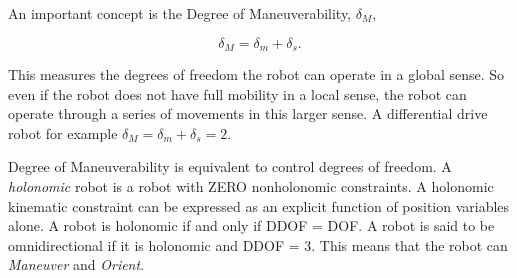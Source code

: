 An important concept is the Degree of Maneuverability, \(\delta_M\),

\[\delta_M = \delta_m + \delta_s.\]

This measures the degrees of freedom the robot can operate in a global
sense. So even if the robot does not have full mobility in a local
sense, the robot can operate through a series of movements in this
larger sense. A differential drive robot for example
\(\delta_M = \delta_m + \delta_s = 2\).

Degree of Maneuverability is equivalent to control degrees of freedom. A
\emph{holonomic} robot is a robot with ZERO nonholonomic constraints. A
holonomic kinematic constraint can be expressed as an explicit function
of position variables alone. A robot is holonomic if and only if DDOF =
DOF. A robot is said to be omnidirectional if it is holonomic and DDOF =
3. This means that the robot can \emph{Maneuver} and \emph{Orient}.

